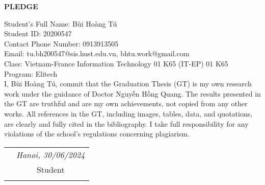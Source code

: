 \documentclass[../main.tex]{subfiles}
\begin{document}
\hfill
\begin{center}
    \LARGE\textbf{PLEDGE}\\
\end{center}
\vspace{1cm}
Student's Full Name: Bùi Hoàng Tú\\
Student ID: 20200547\\
Contact Phone Number: 0913913505\\ 
Email: tu.bh200547@sis.hust.edu.vn, bhtu.work@gmail.com\\
Class: Vietnam-France Information Technology 01 K65 (IT-EP) 01 K65\\
Program: Elitech\\

\vspace{1cm}
I, Bùi Hoàng Tú, commit that the Graduation Thesis (GT) is my own research work under the guidance of Doctor Nguyễn Hồng Quang. The results presented in the GT are truthful and are my own achievements, not copied from any other works. All references in the GT, including images, tables, data, and quotations, are clearly and fully cited in the bibliography. I take full responsibility for any violations of the school's regulations concerning plagiarism.

\begin{table}[H]
\centering
\begin{tabular}{p{5cm} c}
\multicolumn{1}{c}{\textbf{}} &\emph{Hanoi, 30/06/2024}\vspace{0.4cm}\\
\textbf{}               & Student \vspace{3cm} \\

\textbf{}               & \emph{}
\end{tabular}
\end{table}
\end{document}
